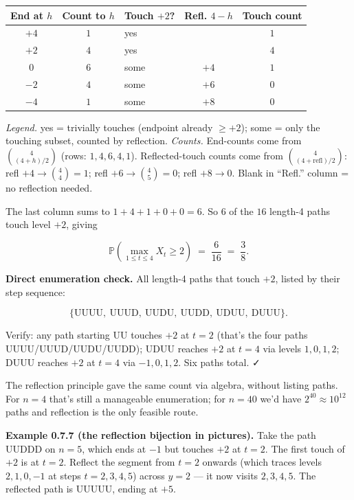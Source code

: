 \documentclass[
  10pt,
  twoside]{book}
\newcounter{none} %
\begin{document}
{\def\LTcaptype{none} %
\begin{table}[H]
\centering
\begin{tabular}{|c|c|l|c|c|}
\toprule
End at \(h\) & Count to \(h\) & Touch \(+2\)? & Refl. \(4-h\) & Touch
count \\
\midrule



\(+4\) & \(1\) & yes & & \(1\) \\
\(+2\) & \(4\) & yes & & \(4\) \\
\(0\) & \(6\) & some & \(+4\) & \(1\) \\
\(-2\) & \(4\) & some & \(+6\) & \(0\) \\
\(-4\) & \(1\) & some & \(+8\) & \(0\) \\
\bottomrule
\end{tabular}
\end{table}
}

\emph{Legend.} yes = trivially touches (endpoint already \(\geq +2\));
some = only the touching subset, counted by reflection. \emph{Counts.}
End-counts come from \(\binom{4}{(4+h)/2}\) (rows: \(1,4,6,4,1\)).
Reflected-touch counts come from \(\binom{4}{(4+\text{refl})/2}\): refl
\(+4 \to \binom{4}{4}=1\); refl \(+6 \to \binom{4}{5}=0\); refl
\(+8 \to 0\). Blank in ``Refl.'' column = no reflection needed.

The last column sums to \(1 + 4 + 1 + 0 + 0 = 6\). So \(6\) of the
\(16\) length-4 paths touch level \(+2\), giving

\[\mathbb{P}\!\left(\max_{1 \le t \le 4} X_t \geq 2\right) \;=\; \frac{6}{16} \;=\; \frac{3}{8}.\]

\textbf{Direct enumeration check.} All length-4 paths that touch \(+2\),
listed by their step sequence:

\[\{\text{UUUU},\ \text{UUUD},\ \text{UUDU},\ \text{UUDD},\ \text{UDUU},\ \text{DUUU}\}.\]

Verify: any path starting UU touches \(+2\) at \(t = 2\) (that's the
four paths UUUU/UUUD/UUDU/UUDD); UDUU reaches \(+2\) at \(t = 4\) via
levels \(1, 0, 1, 2\); DUUU reaches \(+2\) at \(t = 4\) via
\(-1, 0, 1, 2\). Six paths total. ✓

The reflection principle gave the same count via algebra, without
listing paths. For \(n = 4\) that's still a manageable enumeration; for
\(n = 40\) we'd have \(2^{40} \approx 10^{12}\) paths and reflection is
the only feasible route.

\textbf{Example 0.7.7 (the reflection bijection in pictures).} Take the
path UUDDD on \(n = 5\), which ends at \(-1\) but touches \(+2\) at
\(t = 2\). The first touch of \(+2\) is at \(t = 2\). Reflect the
segment from \(t = 2\) onwards (which traces levels \(2, 1, 0, -1\) at
steps \(t = 2, 3, 4, 5\)) across \(y = 2\) --- it now visits
\(2, 3, 4, 5\). The reflected path is UUUUU, ending at \(+5\).
\end{document}
